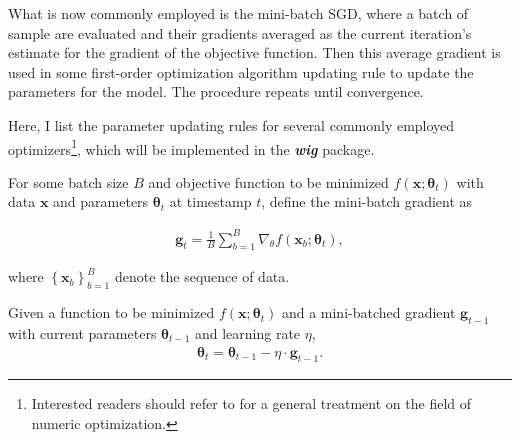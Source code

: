 What is now commonly employed is the mini-batch SGD, where a batch of sample are evaluated and their gradients averaged
as the current iteration's estimate for the gradient of the objective function.
Then this average gradient is used in some first-order optimization algorithm updating rule
to update the parameters for the model.
The procedure repeats until convergence.


Here, I list the parameter updating rules for several commonly employed optimizers\footnote{
  Interested readers should refer to \citet{nocedal2006} for a general treatment on the field of numeric optimization.
},
which will be implemented in the \textbf{\textit{wig}} package.

\begin{definition}
  For some batch size $B$ and objective function to be minimized
  $f \left(\mathbf{x} ; \boldsymbol\theta_t\right)$ with
  data $\mathbf{x}$ and
  parameters $\boldsymbol\theta_t$ at timestamp $t$,
  define the mini-batch gradient as

  \begin{equation}
    \begin{aligned}
      \mathbf{g}_t =
      \frac1B \sum_{b=1}^B \nabla_\theta f(\mathbf{x}_b; \boldsymbol\theta_{t}),
    \end{aligned}
  \end{equation}

  where $\left\{\mathbf{x}_b\right\}_{b = 1}^{B}$ denote the sequence of data.
\end{definition}


\begin{update}
  Given a function to be minimized $f \left(\mathbf{x} ; \boldsymbol\theta_t\right)$
  and a mini-batched gradient $\mathbf{g}_{t-1}$
  with current parameters $\boldsymbol\theta_{t-1}$
  and learning rate $\eta$,
  \begin{equation*}
    \begin{aligned}
      \boldsymbol\theta_t = \boldsymbol\theta_{t-1} - \eta \cdot \mathbf{g}_{t-1}.
    \end{aligned}
  \end{equation*}
\end{update}

